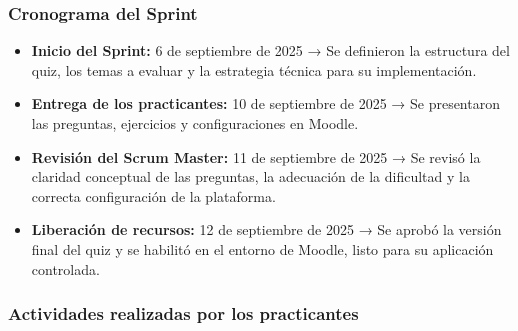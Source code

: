 \documentclass[letter,oneside,12pt,spanish]{report}
\begin{document}
\subsubsection*{Cronograma del Sprint}
\begin{itemize}
	\item \textbf{Inicio del Sprint:} 6 de septiembre de 2025 → Se definieron la estructura del quiz, los temas a evaluar y la estrategia técnica para su implementación.
	\item \textbf{Entrega de los practicantes:} 10 de septiembre de 2025 → Se presentaron las preguntas, ejercicios y configuraciones en Moodle.
	\item \textbf{Revisión del Scrum Master:} 11 de septiembre de 2025 → Se revisó la claridad conceptual de las preguntas, la adecuación de la dificultad y la correcta configuración de la plataforma.
	\item \textbf{Liberación de recursos:} 12 de septiembre de 2025 → Se aprobó la versión final del quiz y se habilitó en el entorno de Moodle, listo para su aplicación controlada.
\end{itemize}

\subsubsection*{Actividades realizadas por los practicantes}
\end{document}
